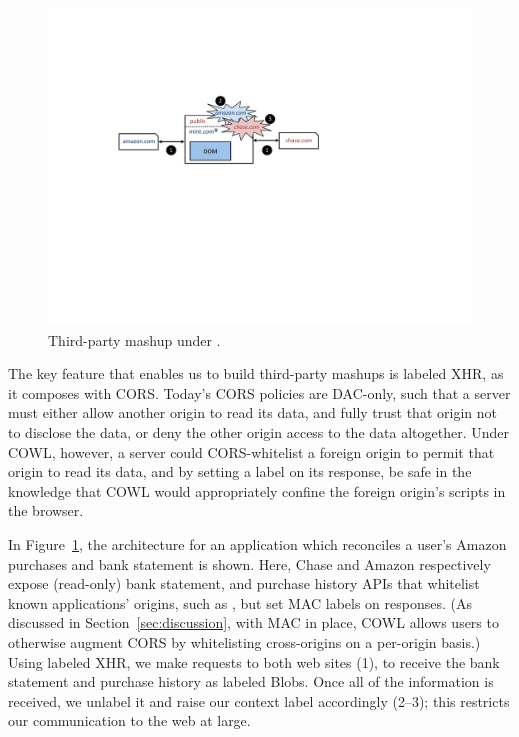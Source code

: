 \begin{figure}
\centerline{\includegraphics[width=\columnwidth]{mashup}}
\caption{\label{fig:mashup} Third-party mashup under \sys{}.}
\end{figure}
The key feature that enables us to build third-party mashups is
labeled XHR, as it composes with CORS.
%
Today's CORS policies are DAC-only, such that a server must
either allow another origin to read its data, and fully trust that
origin not to disclose the data, or deny the other origin access to
the data altogether. Under COWL, however, a server could
CORS-whitelist a foreign origin to permit that origin to read its
data, and by setting a label on its response, be safe in the knowledge
that COWL would appropriately confine the foreign origin's scripts in
the browser.
 
In Figure~\ref{fig:mashup},
the architecture for an application which reconciles a user's Amazon
purchases and bank statement is shown. 
%
Here, Chase and Amazon respectively expose (read-only) bank statement,
and purchase history APIs that whitelist known applications' origins,
such as , but set MAC labels on responses.
%
(As discussed in Section~\ref{sec:discussion}, with MAC in place, COWL
allows users to otherwise augment CORS by whitelisting cross-origins
on a per-origin basis.)
%
%
Using labeled XHR, we make requests to both web sites (1),
to receive the bank statement and
purchase history as labeled Blobs.
%
Once all of the information is received, we unlabel it and raise
our context label accordingly (2--3); this restricts our communication
to the web at large.

